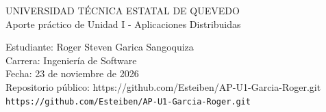 \documentclass[11pt,a4paper]{article}
\begin{document}
\begin{center}
{\Large UNIVERSIDAD T\'ECNICA ESTATAL DE QUEVEDO}\\
Aporte pr\'actico de Unidad I - Aplicaciones Distribuidas
\end{center}
\noindent Estudiante: Roger Steven Garica Sangoquiza\\
Carrera: Ingenier\'ia de Software\\
Fecha: 23 de noviembre de 2026\\
Repositorio p\'ublico: https://github.com/Esteiben/AP-U1-Garcia-Roger.git\\
{\small\texttt{https://github.com/Esteiben/AP-U1-Garcia-Roger.git}}
\end{document}
